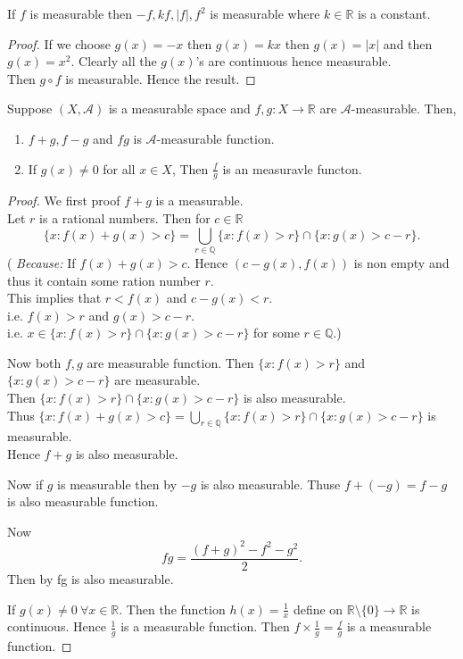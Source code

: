 \begin{corollary}
    \label{-f}
    If $f$ is measurable then  $-f,kf,|f|,f^{2}$ is measurable where $k\in\mathds{R}$ is a constant.
\end{corollary}
\begin{proof}
    If we choose $g(x)=-x$ then $g(x)=kx$ then $g(x)=|x|$ and then $g(x)=x^{2}$. Clearly all the $g(x)$'s are continuous hence measurable.\\
    Then  $g\circ f$ is measurable. Hence the result.
\end{proof}

\begin{theorem}[]
    \label{f+g}
    Suppose $(X,\mathcal{A})$ is a measurable space and $f,g:X\to\mathds{R}$ are $\mathcal{A}$-measurable. Then,
    \begin{enumerate}
        \item $f+g,f-g$ and $fg$ is  $\mathcal{A}$-measurable function.
        \item If $g(x)\neq 0$ for all  $x\in X$, Then  $\frac{f}{g}$ is an measuravle functon.
    \end{enumerate}
\end{theorem}
\begin{proof}
    We first proof $f+g$ is a measurable.\\
    Let  $r$ is a rational numbers. Then for $c\in\mathds{R}$
    \begin{equation}
        \{x:f(x)+g(x)>c\}=\bigcup_{r\in\mathds{Q}}\{x:f(x)>r\}\cap\{x:g(x)>c-r\}.
    \end{equation}
    ( \textit{Because:} If $f(x)+g(x)>c$. Hence  $(c-g(x),f(x))$ is non empty and thus it contain some ration number  $r$.\\
    This implies that $r<f(x)$ and  $c-g(x)<r$.\\
    i.e.  $f(x)>r$ and  $g(x)>c-r$.\\
    i.e.  $x \in \{x:f(x)>r\}\cap\{x:g(x)>c-r\}$ for some  $r\in\mathds{Q}$.)

    Now both $f,g$ are measurable function. Then $\{x:f(x)>r\}$ and $\{x:g(x)>c-r\}$ are measurable.\\
    Then $\{x:f(x)>r\}\cap\{x:g(x)>c-r\}$ is also measurable.\\
    Thus $\{x:f(x)+g(x)>c\}=\bigcup_{r\in\mathds{Q}}\{x:f(x)>r\}\cap\{x:g(x)>c-r\}$ is measurable.\\
    Hence $f+g$ is also measurable.

    Now if $g$ is measurable then by  $-g$ is also measurable. Thuse  $f+(-g)=f-g$ is also measurable function.

    Now 
    \[
        fg=\frac{(f+g)^{2}-f^2-g^2}{2}.
    \]
    Then by  fg is also measurable.

    If $g(x)\neq 0\ \forall x\in \mathds{R}$. Then the function $h(x)=\frac{1}{x}$ define on  $\mathds{R}\setminus\{0\}\to\mathds{R}$ is continuous.
    Hence $\frac{1}{g}$ is a measurable function. Then  $f\times\frac{1}{g}=\frac{f}{g}$ is a measurable function.
\end{proof}

